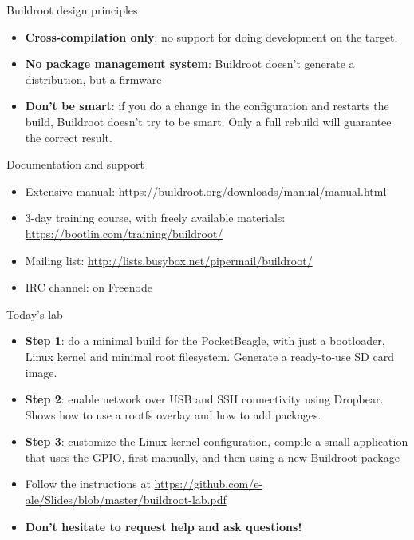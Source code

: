 \documentclass[aspectratio=169,obeyspaces,spaces,hyphens,dvipsnames]{beamer}
\begin{document}
\begin{frame}{Buildroot design principles}

  \begin{itemize}

  \item {\bf Cross-compilation only}: no support for doing development
    on the target.

  \item {\bf No package management system}: Buildroot doesn't generate
    a distribution, but a firmware

  \item {\bf Don't be smart}: if you do a change in the configuration
    and restarts the build, Buildroot doesn't try to be smart. Only a
    full rebuild will guarantee the correct result.

  \end{itemize}

\end{frame}

\begin{frame}{Documentation and support}
  \begin{itemize}
  \item Extensive manual:
    \url{https://buildroot.org/downloads/manual/manual.html}
  \item 3-day training course, with freely available materials:
    \url{https://bootlin.com/training/buildroot/}
  \item Mailing list:
    \url{http://lists.busybox.net/pipermail/buildroot/}
  \item IRC channel:  on Freenode
  \end{itemize}
\end{frame}

\begin{frame}{Today's lab}
  \begin{itemize}
  \item {\bf Step 1}: do a minimal build for the PocketBeagle, with
    just a bootloader, Linux kernel and minimal root
    filesystem. Generate a ready-to-use SD card image.
  \item {\bf Step 2}: enable network over USB and SSH connectivity
    using Dropbear. Shows how to use a rootfs overlay and how to add
    packages.
  \item {\bf Step 3}: customize the Linux kernel configuration,
    compile a small application that uses the GPIO, first manually,
    and then using a new Buildroot package
  \item Follow the instructions at
    \url{https://github.com/e-ale/Slides/blob/master/buildroot-lab.pdf}
  \item {\bf Don't hesitate to request help and ask questions!}
  \end{itemize}
\end{frame}
\end{document}
